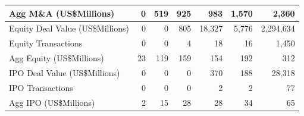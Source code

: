 \documentclass{article}
\begin{document}
\begin{table}[H]
\begin{tabular}{lrrrrrr}
  Agg M\&A (US\$Millions) & 0 & 519 & 925 & 983 & 1,570 & 2,360 \\
   \hline
Equity Deal Value (US\$Millions) & 0 & 0 & 805 & 18,327 & 5,776 & 2,294,634 \\
  Equity  Transactions & 0 & 0 & 4 & 18 & 16 & 1,450 \\
  Agg Equity (US\$Millions) & 23 & 119 & 159 & 154 & 192 & 312 \\
   \hline
IPO Deal Value (US\$Millions) & 0 & 0 & 0 & 370 & 188 & 28,318 \\
  IPO  Transactions & 0 & 0 & 0 & 2 & 2 & 77 \\
  Agg IPO (US\$Millions) & 2 & 15 & 28 & 28 & 34 & 65 \\
   \hline
\end{tabular}
\end{table}
\end{document}
